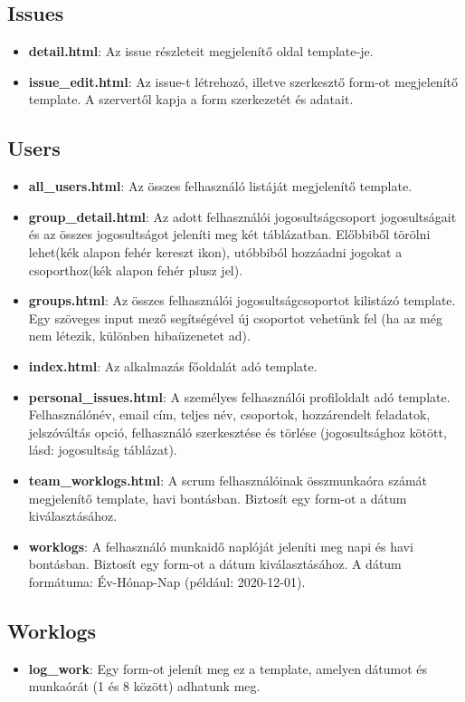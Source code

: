 \subsection{Issues}
\begin{itemize}
	\item \textbf{detail.html}: Az issue részleteit megjelenítő oldal template-je.
	\item \textbf{issue\_edit.html}: Az issue-t létrehozó, illetve szerkesztő form-ot megjelenítő template. A szervertől kapja a form szerkezetét és adatait.
\end{itemize}
\subsection{Users}
\begin{itemize}
	\item \textbf{all\_users.html}: Az összes felhasználó listáját megjelenítő template.
	\item \textbf{group\_detail.html}: Az adott felhasználói jogosultságcsoport jogosultságait és az összes jogosultságot jeleníti meg két táblázatban. Előbbiből törölni lehet(kék alapon fehér kereszt ikon), utóbbiból hozzáadni jogokat a csoporthoz(kék alapon fehér plusz jel).
	\item \textbf{groups.html}: Az összes felhasználói jogosultságcsoportot kilistázó template. Egy szöveges input mező segítségével új csoportot vehetünk fel (ha az még nem létezik, különben hibaüzenetet ad).
	\item \textbf{index.html}: Az alkalmazás főoldalát adó template.
	\item \textbf{personal\_issues.html}: A személyes felhasználói profiloldalt adó template. Felhasználónév, email cím, teljes név, csoportok, hozzárendelt feladatok, jelszóváltás opció, felhasználó szerkesztése és törlése (jogosultsághoz kötött, lásd: jogosultság táblázat).
	\item \textbf{team\_worklogs.html}: A scrum felhasználóinak összmunkaóra számát megjelenítő template, havi bontásban. Biztosít egy form-ot a dátum kiválasztásához.
	\item \textbf{worklogs}: A felhasználó munkaidő naplóját jeleníti meg napi és havi bontásban. Biztosít egy form-ot a dátum kiválasztásához. A dátum formátuma: Év-Hónap-Nap (például: 2020-12-01).
\end{itemize}
\subsection{Worklogs}
\begin{itemize}
	\item \textbf{log\_work}: Egy form-ot jelenít meg ez a template, amelyen dátumot és munkaórát (1 és 8 között) adhatunk meg.
\end{itemize}


